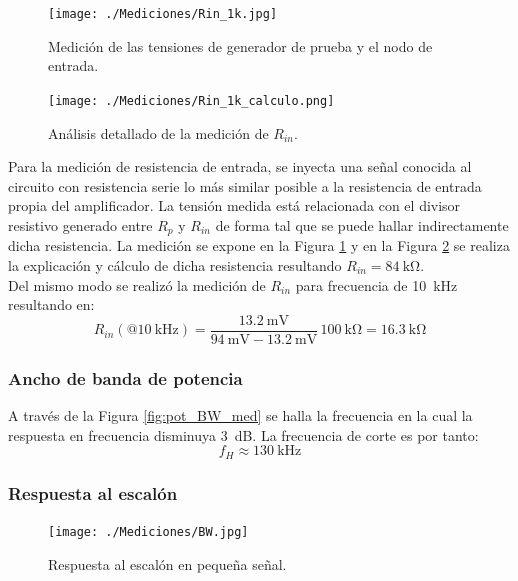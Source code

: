 		\begin{figure}[ H]
			\centering
			\texttt{[image: ./Mediciones/Rin\_1k.jpg]}
			\caption{Medición de las tensiones de generador de prueba y el nodo de entrada.}
			\label{fig:rin_med}
		\end{figure}

		\begin{figure}[ H]
			\centering
			\texttt{[image: ./Mediciones/Rin\_1k\_calculo.png]}
			\caption{Análisis detallado de la medición de $R_{in}$.}
			\label{fig:analisis_rin_med}
		\end{figure}

		Para la medición de resistencia de entrada, se inyecta una señal conocida al circuito con resistencia serie lo más similar posible a la resistencia de entrada propia del amplificador. La tensión medida está relacionada con el divisor resistivo generado entre $R_{p}$ y $R_{in}$ de forma tal que se puede hallar indirectamente dicha resistencia. La medición se expone en la Figura \ref{fig:rin_med} y en la Figura \ref{fig:analisis_rin_med} se realiza la explicación y cálculo de dicha resistencia resultando $\boxed{R_{in}=\SI{84}{\kilo\ohm}}$.\\

		Del mismo modo se realizó la medición de $R_{in}$ para frecuencia de \SI{10}{\kHz} resultando en:
		\begin{equation*}
			R_{in}(@\SI{10}{\kHz})  = \frac{\SI{13.2}{\mV}}{\SI{94}{\mV} - \SI{13.2}{\mV}} \, \SI{100}{\kilo\ohm} = \boxed{\SI{16.3}{\kilo\ohm}}
		\end{equation*}
		\subsubsection{Ancho de banda de potencia}

		
		A través de la Figura \ref{fig:pot_BW_med} se halla la frecuencia en la cual la respuesta en frecuencia disminuya \SI{3}{\dB}. La frecuencia de corte es por tanto:
		\begin{equation*}
			\boxed{f_H \approx \SI{130}{\kHz}}
		\end{equation*}

		\subsubsection{Respuesta al escalón}
		\begin{figure}[h!]
			\centering
			\texttt{[image: ./Mediciones/BW.jpg]}
			\caption{Respuesta al escalón en pequeña señal.}
			\label{fig:escalon_ss}
		\end{figure}

